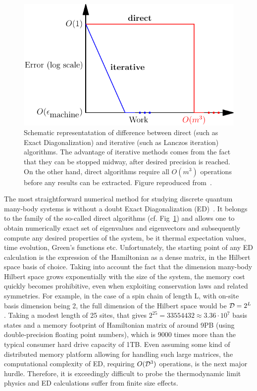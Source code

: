  \begin{figure}[htbp]
	\centering
	\includegraphics{Figures/direct_iterative.pdf}
	\caption{Schematic representatation of difference between direct (such as Exact Diagonalization) and
	iterative (such as Lanczos iteration) algorithms. The advantage of iterative methods comes from the fact that they
	can be stopped midway, after desired precision is reached. On the other hand, direct algorithms require all \(O(m^3)\)
	operations before any results can be extracted. Figure reproduced from~\textcite{Trefethen1997}.}
	\label{fig:direct_iter}
\end{figure}

  The most straightforward numerical method for studying discrete quantum many-body systems is without a doubt
 Exact Diagonalization (ED)~\autocite{Weisse2008}. It belongs to the family of the so-called direct algorithms (cf. Fig~\ref{fig:direct_iter})
and allows one to obtain numerically exact set of eigenvalues and eigenvectors and subsequently compute any desired properties
 of the system, be it thermal expectation values, time evolution, Green's functions etc. Unfortunately, the starting point of any
 ED calculation is the expression of the Hamiltonian as a dense matrix, in the Hilbert space basis of choice. Taking into account
 the fact that the dimension many-body Hilbert space grows exponentially with the size of the system, the memory cost quickly becomes
 prohibitive, even when exploiting conservation laws and related symmetries. For example, in the case of a spin chain of length L, with 
 on-site basis dimension being 2, the full dimension of the Hilbert space would be \(\mathcal{D} = 2^{L}\). Taking a modest length of 25 sites, that gives
 \(2^{25} = 33554432\approx 3.36 \cdot 10^7\) basis states and a memory footprint of Hamiltonian matrix of around 9PB (using double-precision
 floating point numbers), which is 9000 times more than the typical consumer hard drive capacity of 1TB. Even assuming some kind of distributed
 memory platform allowing for handling such large matrices, the computational complexity of ED, requiring \(O(\mathcal{D}^3)\) operations,
 is the next major hurdle. Therefore, it is exceedingly
 difficult to probe the thermodynamic limit physics and ED calculations suffer from finite size effects.
 
